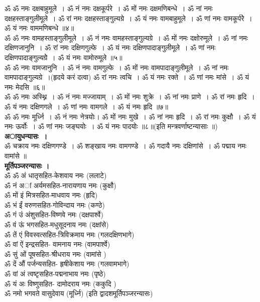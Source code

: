 \documentclass[twoside,top=1.7cm, bottom=1.7cm, outer=1cm,landscape, inner=1.5cm,a5paper,]{book}
\begin{document}
ॐ ॐ नमः दक्षबाहुमूले~। ॐ नं नमः दक्षकूर्परे~। ॐ मों नमः दक्षमणिबन्धे~। ॐ नां नमः दक्षहस्ताङ्गुलीमूले~। ॐ रां नमः दक्षहस्ताङ्गुल्यग्रे~। ॐ यं नमः वामबाहुमूले~। ॐ णां नमः वामकूर्परेे~। ॐ यं नमः वाममणिबन्धे ॥४॥\\[10pt]
ॐ ॐ नमः वामहस्ताङ्गुलीमूले~। ॐ नं नमः वामहस्ताङ्गुल्यग्रे~। ॐ मों नमः दक्षोरुमूले~। ॐ नां नमः दक्षिणजानुनि~। ॐ रां नमः दक्षिणगुल्फे~। ॐ यं नमः दक्षिणपादाङ्गुलीमूले~। ॐ णां नमः दक्षिणपादाङ्गुल्यग्रेे~। ॐ यं नमः वामोरुमूले ॥५॥\\[10pt]
ॐ ॐ नमः वामजानुनि~। ॐ नं नमः वामगुल्फे~। ॐ मों नमः वामपादाङ्गुलीमूले~। ॐ नां नमः वामपादाङ्गुल्यग्रे~।(हृदये करं दत्वा) ॐ रां नमः त्वचि~। ॐ यं नमः रक्ते~। ॐ णां नमः मांसे~। ॐ यं नमः  मेदसि ॥६॥\\[10pt]
ॐ ॐ नमः अस्थ्नि~। ॐ नं नमः मज्जायाम्~। ॐ मों नमः शुक्रे~। ॐ नां नमः प्राणे~। ॐ रां नमः हृदि~। ॐ यं नमः दक्षिणगले~। ॐ णां नमः वामगले~। ॐ यं नमः  हृदि ॥७॥\\[10pt]
ॐ ॐ नमः मूर्ध्नि~। ॐ नं नमः नेत्रयोः। ॐ मों नमः मुखे~। ॐ नां नमः हृदि~। ॐ रां नमः कुक्षौ~। ॐ यं नमः ऊर्वोः~। ॐ णां नमः जङ्घयोः~। ॐ यं नमः पादयोः ॥८॥(इति मन्त्रवर्णाष्टन्यासाः ॥)\\[10pt]
{\bfseries अायुधन्यासः~।}\\ॐ चक्राय नमः दक्षिणगण्डे~। ॐ शङ्खाय नमः वामगण्डे~। ॐ गदायै नमः दक्षिणांसे~। ॐ पद्माय नमः वामांसे ॥ \\[10pt]
{\bfseries मूर्तिपञ्जरन्यासः ।}\\
ॐ ॐ अं धातृसहित-केशवाय नमः (ललाटे)\\
ॐ नं  अां अर्यमसहित-नारायणाय नमः (कुक्षौ)\\
ॐ मों इं मित्रसहित-माधवाय नमः (हृदि)\\
ॐ भं ईं वरुणसहित-गोविन्दाय नमः (कण्ठे)\\
ॐ गं उं अंशुसहित-विष्णवे नमः (दक्षपार्श्वे)\\
ॐ वं ऊं भगसहित-मधुसूदनाय नमः (दक्षांसे)\\
ॐ तें एं विवस्वत्सहित-त्रिविक्रमाय नमः (गलदक्षिणभागे)\\
ॐ वां ऐं इन्द्रसहित- वामनाय नमः (वामपार्श्वे)\\
ॐ सुं ओं पूषसहित-श्रीधराय नमः (वामांसे )\\
ॐ दें औं पर्जन्यसहित- हृषीकेशाय नमः (गलवामभागे)\\
ॐ वां अं त्वष्टृसहित-पद्मनाभाय नमः (पृष्ठे)\\
ॐ यं अः विष्णुसहित- दामोदराय नमः (ककुदि )\\
ॐ नमो भगवते वासुदेवाय  (मूर्ध्नि) (इति द्वादशमूर्तिपञ्जरन्यासः)\\
\end{document}
